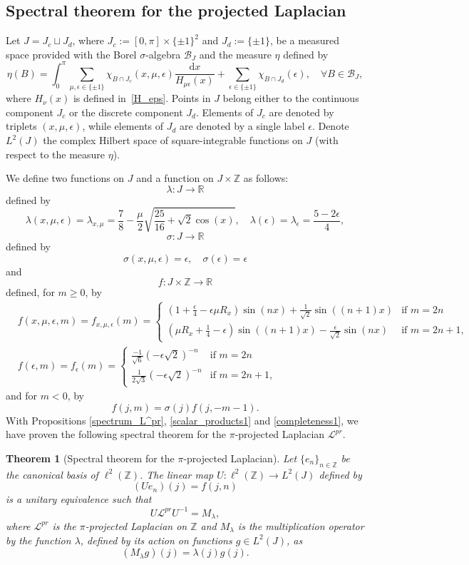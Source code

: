\documentclass[11pt]{amsart}
\newcommand{\Z}{\mathbb{Z}}
\newcommand{\R}{\mathbb{R}}
\theoremstyle{definition}
\theoremstyle{remark}
\theoremstyle{plain}
\newtheorem{theorem}{Theorem}
\numberwithin{equation}{section}
\numberwithin{lemma}{section}
\numberwithin{definition}{section}
\numberwithin{proposition}{section}
\numberwithin{corollary}{section}
\numberwithin{theorem}{section}
\numberwithin{remark}{section}
\begin{document}
\subsection{Spectral theorem for the projected Laplacian}

 Let $J=J_c\sqcup J_d$, where $J_c:=[0,\pi]\times\{\pm1\}^2$ and $J_d:=\{\pm1\}$, be a measured space provided with the Borel $\sigma$-algebra $\mathcal{B}_J$ and the measure $\eta$ defined by 
 $$
 \eta(B)=\int_0^\pi \sum_{\mu,\epsilon\in\{\pm1\}} \chi_{B\cap J_c}(x,\mu,\epsilon) \frac{\mathrm{d}x}{H_{\mu\epsilon}(x)}+\sum_{\epsilon\in\{\pm1\}} \chi_{B\cap J_d}(\epsilon), \quad \forall B\in \mathcal{B}_J,
 $$
 where $H_\nu(x)$ is defined in~\eqref{H_eps}.
 Points in $J$ belong either to the continuous component $J_c$ or the discrete component $J_d$. Elements of $J_c$ are denoted by triplets $(x,\mu,\epsilon)$, while elements of $J_d$ are denoted by a single label $\epsilon$.
 Denote $L^2(J)$ the complex Hilbert space of square-integrable functions on $J$ (with respect to the measure $\eta$). 
 
 We define two functions on $J$ and a function on $J\times \Z$ as follows:
 $$
 \lambda:J\to\R
 $$
 defined by 
 $$
\lambda(x,\mu,\epsilon)=\lambda_{x,\mu}=\frac{7}{8}-\frac{\mu}{2}\sqrt{\frac{25}{16}+\sqrt{2}\cos(x)}, \quad \lambda(\epsilon)=\lambda_\epsilon=\frac{5-2\epsilon}{4},
 $$
 $$
 \sigma: J \to \R
 $$
 defined by
 $$
 \sigma(x,\mu,\epsilon)=\epsilon, \quad \sigma(\epsilon)=\epsilon
 $$
 and 
 $$
 f: J \times \Z \to \R
 $$
 defined, for $m\ge0$, by
\begin{align*}
& f(x,\mu,\epsilon,m)=f_{x,\mu,\epsilon}(m)=
 \begin{cases}
 (1+\frac{\epsilon}{4}-\epsilon\mu R_x)\sin(nx)+\frac{1}{\sqrt{2}}\sin((n+1)x) & \text{if } m=2n  \\
 (\mu R_x+\frac{1}{4}-\epsilon)\sin((n+1)x)-\frac{\epsilon}{\sqrt{2}}\sin(nx) & \text{if } m=2n+1,
\end{cases}
\\
& f(\epsilon,m)=f_\epsilon(m)=
\begin{cases}
 \frac{-1}{\sqrt{6}}(-\epsilon\sqrt{2})^{-n} & \text{if } m=2n \\
 \frac{1}{2\sqrt{3}}(-\epsilon\sqrt{2})^{-n} & \text{if } m=2n+1,
\end{cases}
\end{align*}
and for $m<0$, by
$$
f(j,m)=\sigma(j)f(j,-m-1).
$$
With Propositions \ref{spectrum_L^pr}, \ref{scalar_products1} and \ref{completeness1}, we have proven the following spectral theorem for the $\pi$-projected Laplacian $\mathcal{L}^{pr}$.
\begin{theorem}[Spectral theorem for the $\pi$-projected Laplacian] \label{spectral_thm_1}
Let $\{e_n\}_{n\in\Z}$ be the canonical basis of $\ell^2(\Z)$.
The linear map $U: \ell^2(\Z) \to L^2(J)$
 defined by 
 $$
(Ue_n)(j)=f(j,n)
$$
 is a unitary equivalence such that 
 $$
 U\mathcal{L}^{pr}U^{-1}=M_{\lambda},
 $$
 where 
 $\mathcal{L}^{pr}$ is the $\pi$-projected Laplacian on $\Z$ and $M_{\lambda}$ is the multiplication operator by the function $\lambda$, defined by its action on functions $g\in L^2(J)$, as
 $$
 (M_{\lambda}g)(j)=\lambda(j)g(j).
 $$
\end{theorem}
\end{document}
